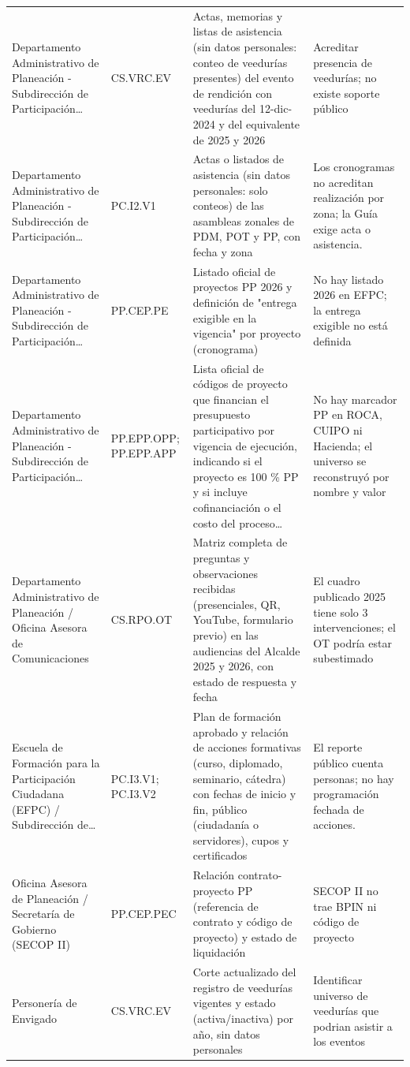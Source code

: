 \documentclass[11pt,letterpaper]{article}
\begin{document}
{\begin{xltabular}{\linewidth}{L{3.4cm}L{2.2cm}YL{3cm}}
Departamento Administrativo de Planeación - Subdirección de Participación\ldots{} & CS.VRC.EV & Actas, memorias y listas de asistencia (sin datos personales: conteo de veedurías presentes) del evento de rendición con veedurías del 12-dic-2024 y del equivalente de 2025 y 2026 & Acreditar presencia de veedurías; no existe soporte público \\
Departamento Administrativo de Planeación - Subdirección de Participación\ldots{} & PC.I2.V1 & Actas o listados de asistencia (sin datos personales: solo conteos) de las asambleas zonales de PDM, POT y PP, con fecha y zona & Los cronogramas no acreditan realización por zona; la Guía exige acta o asistencia. \\
Departamento Administrativo de Planeación - Subdirección de Participación\ldots{} & PP.CEP.PE & Listado oficial de proyectos PP 2026 y definición de "entrega exigible en la vigencia" por proyecto (cronograma) & No hay listado 2026 en EFPC; la entrega exigible no está definida \\
Departamento Administrativo de Planeación - Subdirección de Participación\ldots{} & PP.EPP.OPP; PP.EPP.APP & Lista oficial de códigos de proyecto que financian el presupuesto participativo por vigencia de ejecución, indicando si el proyecto es 100 \% PP y si incluye cofinanciación o el costo del proceso\ldots{} & No hay marcador PP en ROCA, CUIPO ni Hacienda; el universo se reconstruyó por nombre y valor \\
Departamento Administrativo de Planeación / Oficina Asesora de Comunicaciones & CS.RPO.OT & Matriz completa de preguntas y observaciones recibidas (presenciales, QR, YouTube, formulario previo) en las audiencias del Alcalde 2025 y 2026, con estado de respuesta y fecha & El cuadro publicado 2025 tiene solo 3 intervenciones; el OT podría estar subestimado \\
Escuela de Formación para la Participación Ciudadana (EFPC) / Subdirección de\ldots{} & PC.I3.V1; PC.I3.V2 & Plan de formación aprobado y relación de acciones formativas (curso, diplomado, seminario, cátedra) con fechas de inicio y fin, público (ciudadanía o servidores), cupos y certificados & El reporte público cuenta personas; no hay programación fechada de acciones. \\
Oficina Asesora de Planeación / Secretaría de Gobierno (SECOP II) & PP.CEP.PEC & Relación contrato-proyecto PP (referencia de contrato y código de proyecto) y estado de liquidación & SECOP II no trae BPIN ni código de proyecto \\
Personería de Envigado & CS.VRC.EV & Corte actualizado del registro de veedurías vigentes y estado (activa/inactiva) por año, sin datos personales & Identificar universo de veedurías que podrian asistir a los eventos \\

\end{xltabular}}
\end{document}
